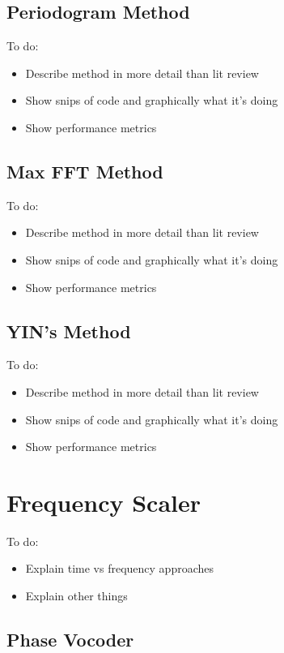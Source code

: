 \subsection{Periodogram Method}

\color{red}
To do:
\begin{itemize}
	\item Describe method in more detail than lit review
	\item Show snips of code and graphically what it's doing
	\item Show performance metrics
\end{itemize}
\color{black}

\subsection{Max FFT Method}

\color{red}
To do:
\begin{itemize}
	\item Describe method in more detail than lit review
	\item Show snips of code and graphically what it's doing
	\item Show performance metrics
\end{itemize}
\color{black}

\subsection{YIN's Method}

\color{red}
To do:
\begin{itemize}
	\item Describe method in more detail than lit review
	\item Show snips of code and graphically what it's doing
	\item Show performance metrics
\end{itemize}
\color{black}

\section{Frequency Scaler}

\color{red}
To do:
\begin{itemize}
	\item Explain time vs frequency approaches
	\item Explain other things
\end{itemize}
\color{black}

\subsection{Phase Vocoder}


